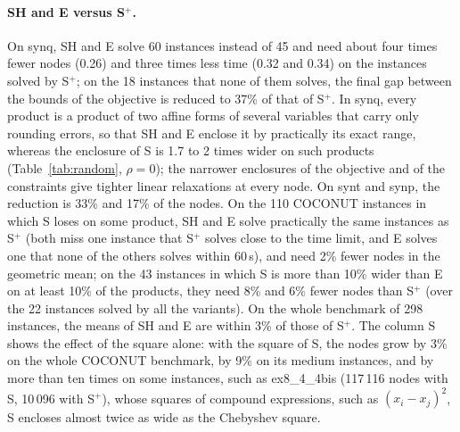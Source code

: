\documentclass[10pt]{article}
\theoremstyle{definition}
\begin{document}
\begin{table}[H]
\centering
\caption{IbexOpt with S (the standard multiplication and square of fAF2), S$^+$ (the products of S with the Chebyshev square), SH and E (both with the Chebyshev square): instances solved within the time limit $t_{\max}$ (s), geometric means of nodes and CPU time relative to S$^+$ over the instances solved by all the variants, geometric mean of the nodes of E relative to SH, and numbers of instances where E needs at least 1\% fewer / more nodes than SH. For COCONUT, $x/y$: the $x$ instances in which S encloses some product more widely than E, out of $y$.}
\label{tab:solver}
\small
\setlength{\tabcolsep}{3.5pt}

\end{table}

\paragraph{SH and E versus S$^+$.} On synq, SH and E solve 60 instances instead of 45 and need about four times fewer nodes (0.26) and three times less time (0.32 and 0.34) on the instances solved by S$^+$; on the 18 instances that none of them solves, the final gap between the bounds of the objective is reduced to 37\% of that of S$^+$. In synq, every product is a product of two affine forms of several variables that carry only rounding errors, so that SH and E enclose it by practically its exact range, whereas the enclosure of S is 1.7 to 2 times wider on such products (Table~\ref{tab:random}, $\rho=0$); the narrower enclosures of the objective and of the constraints give tighter linear relaxations at every node. On synt and synp, the reduction is 33\% and 17\% of the nodes. On the 110 COCONUT instances in which S loses on some product, SH and E solve practically the same instances as S$^+$ (both miss one instance that S$^+$ solves close to the time limit, and E solves one that none of the others solves within 60\,s), and need 2\% fewer nodes in the geometric mean; on the 43 instances in which S is more than 10\% wider than E on at least 10\% of the products, they need 8\% and 6\% fewer nodes than S$^+$ (over the 22 instances solved by all the variants). On the whole benchmark of 298 instances, the means of SH and E are within 3\% of those of S$^+$. The column S shows the effect of the square alone: with the square of S, the nodes grow by 3\% on the whole COCONUT benchmark, by 9\% on its medium instances, and by more than ten times on some instances, such as ex8\_4\_4bis (117\,116 nodes with S, 10\,096 with S$^+$), whose squares of compound expressions, such as $(x_i-x_j)^2$, S encloses almost twice as wide as the Chebyshev square.
\end{document}
